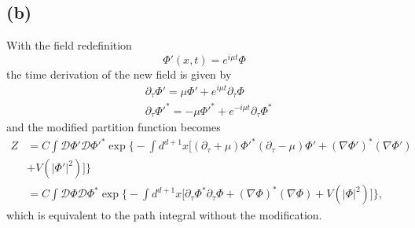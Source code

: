 \documentclass[12pt]{article}
\begin{document}
\subsection*{(b)}

With the field redefinition
\begin{equation}
    \Phi'(x,t)=e^{i\mu t}\Phi
\end{equation}
the time derivation of the new field is given by
\begin{equation}
    \begin{split}
        &\partial_\tau\Phi'=\mu\Phi'+e^{i\mu t}\partial_\tau\Phi\\
        &\partial_\tau\Phi'^*=-\mu\Phi'^*+e^{-i\mu t}\partial_\tau\Phi^*
    \end{split}
\end{equation}
and the modified partition function becomes
\begin{equation}
    \begin{split}
        Z&=C\int \mathcal{D}\Phi'\mathcal{D}\Phi'^*\exp\bigg\{-\int d^{d+1}x
        \Big[(\partial_\tau+\mu)\Phi'^*(\partial_\tau-\mu)\Phi'+(\nabla\Phi')^*
        (\nabla\Phi')\\
        &+V(|\Phi'|^2)\Big]\bigg\}\\
        &=C\int \mathcal{D}\Phi\mathcal{D}\Phi^*\exp\bigg\{-\int d^{d+1}x
        \Big[\partial_\tau\Phi^*\partial_\tau\Phi+(\nabla\Phi)^*
        (\nabla\Phi)+V(|\Phi|^2)\Big]\bigg\},
    \end{split}
\end{equation}
which is equivalent to the path integral without the modification.
\end{document}

